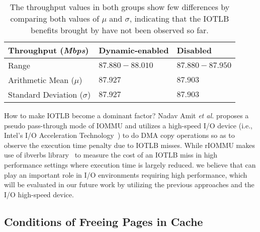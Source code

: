\begin{table}[!ht]
\footnotesize
\begin{center}
\begin{tabular}{|l|l|l|}
\hline
{\textbf{Throughput (\emph{Mbps})}} & {\textbf{Dynamic-enabled}} & {\textbf{Disabled}}    \\ \hline
Range & $87.880-88.010$ & $87.880-87.950$ \\ \hline
Arithmetic Mean ($\mu$)  &  $87.927$ & $87.903$ \\ \hline
Standard Deviation ($\sigma$) &  $87.927$ & $87.903$ \\ \hline
\end{tabular}
\end{center}
\caption{The throughput values in both groups show few differences by comparing both values of $\mu$ and $\sigma$, indicating that the IOTLB benefits brought by \name have not been observed so far.}
\label{tab:netperf}
\end{table}

How to make IOTLB become a dominant factor? Nadav Amit \emph{et al.} proposes a pseudo pass-through mode of IOMMU and utilizes a high-speed I/O device (i.e., Intel’s I/O Acceleration Technology~\cite{lauritzenintel}) to do DMA copy operations so as to observe the execution time penalty due to IOTLB misses. While rIOMMU makes use of ibverbs library~\cite{ibverbsevaluation,kerr2011dissecting} to measure the cost of an IOTLB miss in high performance settings where execution time is largely reduced.
we believe that \name can play an important role in I/O environments requiring high performance, which will be evaluated in our future work by utilizing the previous approaches and the I/O high-speed device.

\subsection{Conditions of Freeing Pages in Cache}

